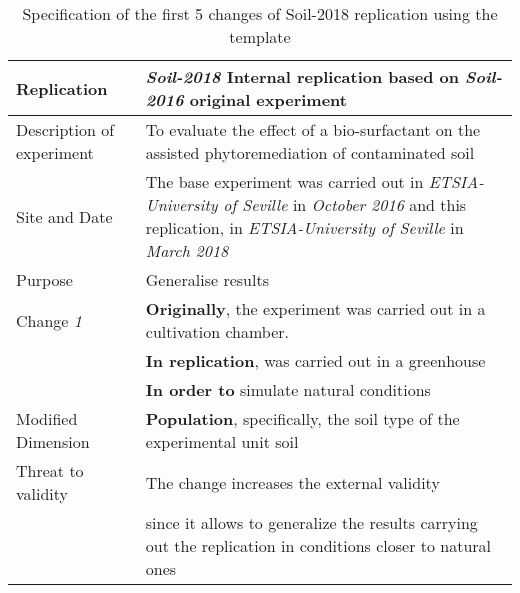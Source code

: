 \begin{table*}[h]
    \caption{Specification of the first 5 changes of Soil-2018 replication using the template}
  
    \label{tab:template-Soil}
    \centering
	\scriptsize

    \begin{tabularx}{\textwidth}{
        >{\hsize=0.3\hsize}X
        >{\hsize=0.7\hsize}X}
  
    \toprule

    Replication & 
    \textbf{\emph{Soil-2018}}   Internal replication based on \textbf{\emph{Soil-2016}} original experiment  \\
	
	\midrule   
     
    Description of experiment & 
        To evaluate the effect of a bio-surfactant on the assisted phytoremediation of contaminated soil \\  
 
    Site and Date & 
        The base experiment was carried out in  \textit{ETSIA-University of Seville}  in  \textit{October 2016} and this replication, in  \textit{ETSIA-University of Seville} in \textit{March 2018} \\
    
    Purpose  &  
        Generalise results \\  

\hline   
    Change \textit{1}   & 
        \textbf{Originally}, the experiment was carried out in a cultivation chamber. \\& \textbf{In replication}, was carried out in a greenhouse \\& \textbf{In order to} simulate natural conditions \\
    
    Modified Dimension & 
        \textbf{Population}, specifically, 
        the soil type of the experimental unit soil \\
    
    Threat to validity  & 
        The change increases the external validity \\
        & since it allows to generalize the results carrying out the replication in conditions closer to natural ones \\  


\end{tabularx}
\end{table*}

